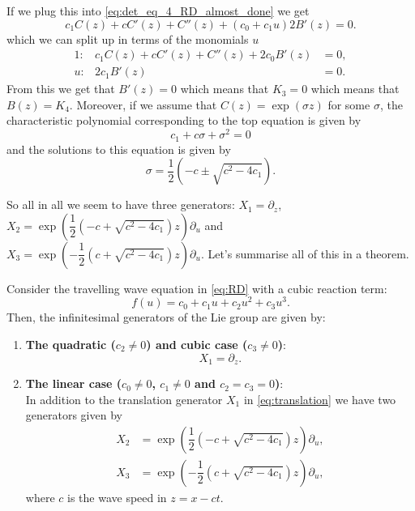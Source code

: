 If we plug this into \eqref{eq:det_eq_4_RD_almost_done} we get  
\begin{equation*}
    c_{1}C(z)+cC'(z)+C''(z)+\left(c_{0}+c_{1}u\right)2B'(z)=0.
  \end{equation*}
  which we can split up in terms of the monomials $u$
  \begin{align*}
    1:&c_{1}C(z)+cC'(z)+C''(z)+2c_{0}B'(z)&=0,\\
    u:&2c_{1}B'(z)&=0.        
  \end{align*}
  From this we get that $B'(z)=0$ which means that $K_{3}=0$ which means that $B(z)=K_4$. Moreover, if we assume that $C(z)=\exp{(\sigma z)}$ for some $\sigma$, the characteristic polynomial corresponding to the top equation is given by
  $$c_{1}+c\sigma+\sigma^2=0$$
  and the solutions to this equation is given by
  $$\sigma=\dfrac{1}{2}\left(-c\pm\sqrt{c^2-4c_{1}}\right).$$

  So all in all we seem to have three generators: $X_{1}=\partial_z$, $X_{2}=\exp{\left(\dfrac{1}{2}\left(-c+\sqrt{c^2-4c_{1}}\right)z\right)}\partial_u$ and $X_{3}=\exp{\left(-\dfrac{1}{2}\left(c+\sqrt{c^2-4c_{1}}\right)z\right)}\partial_u$. Let's summarise all of this in a theorem.

  \begin{theorem}
    Consider the travelling wave equation in \eqref{eq:RD} with a cubic reaction term:
    \begin{equation}
      f(u)=c_{0}+c_{1}u+c_{2}u^2+c_{3}u^3.
      \label{eq:reaction_term}
    \end{equation}
    Then, the infinitesimal generators of the Lie group are given by:\\
    \begin{enumerate}
      \item \textbf{The quadratic ($c_2\neq 0$) and cubic case ($c_3\neq 0$)}:\\
    \begin{equation}
      X_1=\partial_z.
      \label{eq:translation}
    \end{equation}
  \item \textbf{The linear case ($c_0\neq 0$, $c_1\neq 0$ and $c_2=c_3=0$)}:\\
    In addition to the translation generator $X_1$ in \eqref{eq:translation} we have two generators given by
    \begin{align}
      X_2&=\exp{\left(\dfrac{1}{2}\left(-c+\sqrt{c^2-4c_{1}}\right)z\right)}\partial_u,\\
      X_3&=\exp{\left(-\dfrac{1}{2}\left(c+\sqrt{c^2-4c_{1}}\right)z\right)}\partial_u,
    \end{align}
    where $c$ is the wave speed in $z=x-ct$. 
    \end{enumerate}

  \end{theorem}


